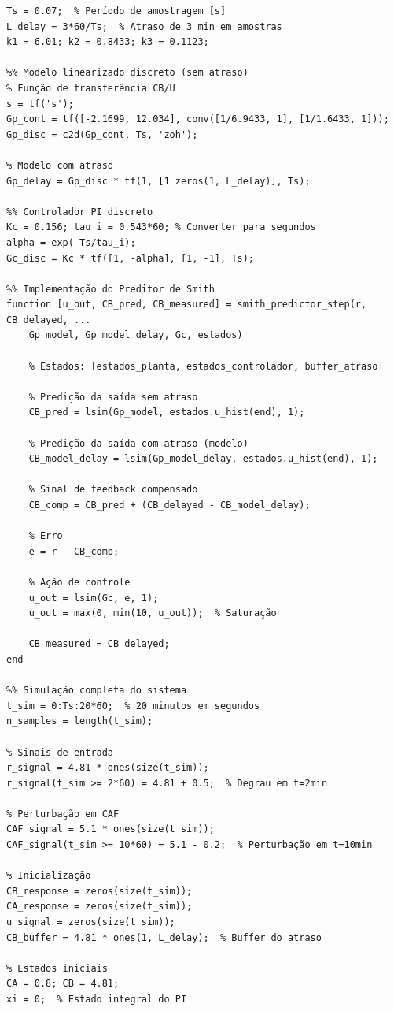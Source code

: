 \documentclass[a4paper,12pt]{article}
\begin{document}
\begin{lstlisting}[caption=Implementação do Preditor de Smith Discreto]
%% Parâmetros do sistema
Ts = 0.07;  % Período de amostragem [s]
L_delay = 3*60/Ts;  % Atraso de 3 min em amostras
k1 = 6.01; k2 = 0.8433; k3 = 0.1123;

%% Modelo linearizado discreto (sem atraso)
% Função de transferência CB/U
s = tf('s');
Gp_cont = tf([-2.1699, 12.034], conv([1/6.9433, 1], [1/1.6433, 1]));
Gp_disc = c2d(Gp_cont, Ts, 'zoh');

% Modelo com atraso
Gp_delay = Gp_disc * tf(1, [1 zeros(1, L_delay)], Ts);

%% Controlador PI discreto
Kc = 0.156; tau_i = 0.543*60; % Converter para segundos
alpha = exp(-Ts/tau_i);
Gc_disc = Kc * tf([1, -alpha], [1, -1], Ts);

%% Implementação do Preditor de Smith
function [u_out, CB_pred, CB_measured] = smith_predictor_step(r, CB_delayed, ...
    Gp_model, Gp_model_delay, Gc, estados)
    
    % Estados: [estados_planta, estados_controlador, buffer_atraso]
    
    % Predição da saída sem atraso
    CB_pred = lsim(Gp_model, estados.u_hist(end), 1);
    
    % Predição da saída com atraso (modelo)
    CB_model_delay = lsim(Gp_model_delay, estados.u_hist(end), 1);
    
    % Sinal de feedback compensado
    CB_comp = CB_pred + (CB_delayed - CB_model_delay);
    
    % Erro
    e = r - CB_comp;
    
    % Ação de controle
    u_out = lsim(Gc, e, 1);
    u_out = max(0, min(10, u_out));  % Saturação
    
    CB_measured = CB_delayed;
end

%% Simulação completa do sistema
t_sim = 0:Ts:20*60;  % 20 minutos em segundos
n_samples = length(t_sim);

% Sinais de entrada
r_signal = 4.81 * ones(size(t_sim));
r_signal(t_sim >= 2*60) = 4.81 + 0.5;  % Degrau em t=2min

% Perturbação em CAF
CAF_signal = 5.1 * ones(size(t_sim));
CAF_signal(t_sim >= 10*60) = 5.1 - 0.2;  % Perturbação em t=10min

% Inicialização
CB_response = zeros(size(t_sim));
CA_response = zeros(size(t_sim));
u_signal = zeros(size(t_sim));
CB_buffer = 4.81 * ones(1, L_delay);  % Buffer do atraso

% Estados iniciais
CA = 0.8; CB = 4.81;
xi = 0;  % Estado integral do PI


\end{lstlisting}
\end{document}
